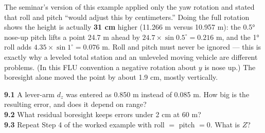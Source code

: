 \begin{improve}
The seminar's version of this example applied only the yaw rotation and stated that roll and pitch ``would adjust this by centimeters.'' Doing the full rotation shows the height is actually \textbf{31 cm} higher (11.266 m versus 10.957 m): the 0.5° nose-up pitch lifts a point 24.7 m ahead by $24.7\times\sin0.5^\circ=0.216$ m, and the 1° roll adds $4.35\times\sin1^\circ=0.076$ m. Roll and pitch must never be ignored --- this is exactly why a leveled total station and an unleveled moving vehicle are different problems. (In this FLU convention a negative rotation about $y$ is nose up.) The boresight alone moved the point by about 1.9 cm, mostly vertically.
\end{improve}

\begin{tryit}
\textbf{9.1} A lever-arm $d_z$ was entered as 0.850 m instead of 0.085 m. How big is the resulting error, and does it depend on range?\\
\textbf{9.2} What residual boresight keeps errors under 2 cm at 60 m?\\
\textbf{9.3} Repeat Step 4 of the worked example with roll $=$ pitch $=0$. What is $Z$?
\end{tryit}

